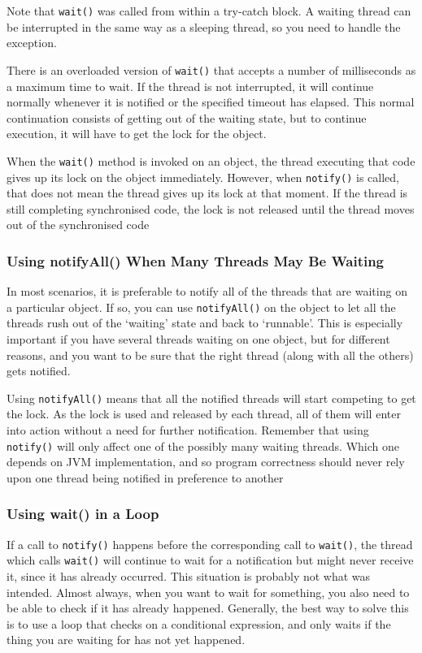 Note that \verb#wait()# was called from within a try-catch block. A waiting 
thread can be interrupted in the same way as a sleeping thread, so you need to 
handle the exception.

There is an overloaded version of \verb#wait()# that accepts a number of 
milliseconds as a maximum time to wait. If the thread is not interrupted, it 
will continue normally whenever it is notified or the specified timeout has 
elapsed. This normal continuation consists of getting out of the waiting state, 
but to continue execution, it will have to get the lock for the object.

When the \verb#wait()# method is invoked on an object, the thread executing 
that code gives up its lock on the object immediately. However, when 
\verb#notify()# is called, that does not mean the thread gives up its lock at 
that moment. If the thread is still completing synchronised code, the lock is 
not released until the thread moves out of the synchronised code

\subsubsection{Using notifyAll() When Many Threads May Be Waiting}
In most scenarios, it is preferable to notify all of the threads that are 
waiting on a particular object. If so, you can use \verb#notifyAll()# on the 
object to let all the threads rush out of the `waiting' state and back to 
`runnable'. This is especially important if you have several threads waiting on 
one object, but for different reasons, and you want to be sure that the right 
thread (along with all the others) gets notified.

Using \verb#notifyAll()# means that all the notified threads will start 
competing to get the lock. As the lock is used and released by each thread, all 
of them will enter into action without a need for further notification.  
Remember that using \verb#notify()# will only affect one of the possibly many 
waiting threads. Which one depends on JVM implementation, and so program 
correctness should never rely upon one thread being notified in preference to 
another

\subsubsection{Using wait() in a Loop}
If a call to \verb#notify()# happens before the corresponding call to 
\verb#wait()#, the thread which calls \verb#wait()# will continue to wait for a 
notification but might never receive it, since it has already occurred. This 
situation is probably not what was intended. Almost always, when you want to 
wait for something, you also need to be able to check if it has already 
happened. Generally, the best way to solve this is to use a loop that checks on 
a conditional expression, and only waits if the thing you are waiting for has 
not yet happened.

